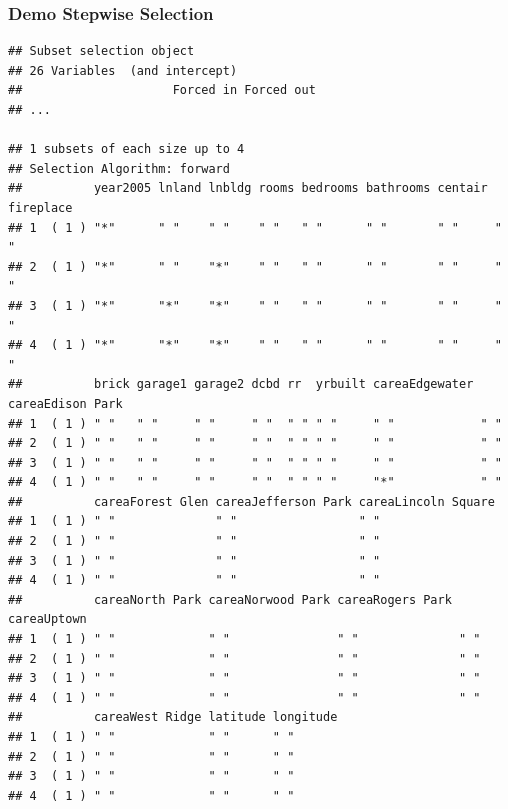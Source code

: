 \documentclass[
  shownotes,
  xcolor={svgnames},
  hyperref={colorlinks,citecolor=DarkBlue,linkcolor=DarkRed,urlcolor=DarkBlue}
  ]{beamer}
\newenvironment{Shaded}{\begin{snugshade}}{\end{snugshade}}
\newcommand{\KeywordTok}[1]{\textcolor[rgb]{0.13,0.29,0.53}{\textbf{#1}}}
\newcommand{\NormalTok}[1]{#1}
\newcommand{\OperatorTok}[1]{\textcolor[rgb]{0.81,0.36,0.00}{\textbf{#1}}}
\begin{document}
\begin{frame}[fragile]
\frametitle{Demo Stepwise Selection}

\begin{scriptsize}
\begin{Shaded}
\end{Shaded}
\end{scriptsize}
\begin{tiny}
\begin{verbatim}
## Subset selection object
## 26 Variables  (and intercept)
##                     Forced in Forced out
## ...

## 1 subsets of each size up to 4
## Selection Algorithm: forward
##          year2005 lnland lnbldg rooms bedrooms bathrooms centair fireplace
## 1  ( 1 ) "*"      " "    " "    " "   " "      " "       " "     " "      
## 2  ( 1 ) "*"      " "    "*"    " "   " "      " "       " "     " "      
## 3  ( 1 ) "*"      "*"    "*"    " "   " "      " "       " "     " "      
## 4  ( 1 ) "*"      "*"    "*"    " "   " "      " "       " "     " "      
##          brick garage1 garage2 dcbd rr  yrbuilt careaEdgewater careaEdison Park
## 1  ( 1 ) " "   " "     " "     " "  " " " "     " "            " "             
## 2  ( 1 ) " "   " "     " "     " "  " " " "     " "            " "             
## 3  ( 1 ) " "   " "     " "     " "  " " " "     " "            " "             
## 4  ( 1 ) " "   " "     " "     " "  " " " "     "*"            " "             
##          careaForest Glen careaJefferson Park careaLincoln Square
## 1  ( 1 ) " "              " "                 " "                
## 2  ( 1 ) " "              " "                 " "                
## 3  ( 1 ) " "              " "                 " "                
## 4  ( 1 ) " "              " "                 " "                
##          careaNorth Park careaNorwood Park careaRogers Park careaUptown
## 1  ( 1 ) " "             " "               " "              " "        
## 2  ( 1 ) " "             " "               " "              " "        
## 3  ( 1 ) " "             " "               " "              " "        
## 4  ( 1 ) " "             " "               " "              " "        
##          careaWest Ridge latitude longitude
## 1  ( 1 ) " "             " "      " "      
## 2  ( 1 ) " "             " "      " "      
## 3  ( 1 ) " "             " "      " "      
## 4  ( 1 ) " "             " "      " "
\end{verbatim}
\end{tiny}


\end{frame}
\end{document}
